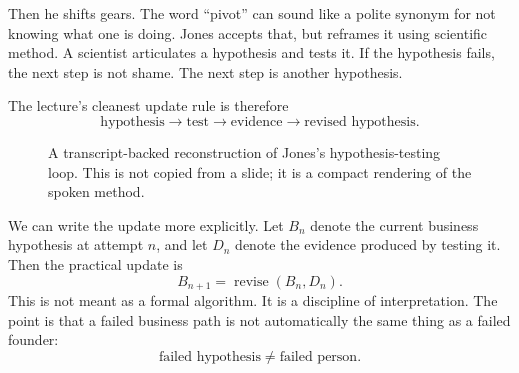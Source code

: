 Then he shifts gears. The word ``pivot'' can sound like a polite synonym for not knowing what one is doing. Jones accepts that, but reframes it using scientific method. A scientist articulates a hypothesis and tests it. If the hypothesis fails, the next step is not shame. The next step is another hypothesis.

The lecture's cleanest update rule is therefore
\begin{equation}
\text{hypothesis}
\longrightarrow
\text{test}
\longrightarrow
\text{evidence}
\longrightarrow
\text{revised hypothesis}.
\end{equation}

\begin{figure}
\centering
{}
\caption{A transcript-backed reconstruction of Jones's hypothesis-testing loop. This is not copied from a slide; it is a compact rendering of the spoken method.}
\end{figure}

We can write the update more explicitly. Let \(B_n\) denote the current business hypothesis at attempt \(n\), and let \(D_n\) denote the evidence produced by testing it. Then the practical update is
\begin{equation}
B_{n+1}=\operatorname{revise}(B_n,D_n).
\end{equation}
This is not meant as a formal algorithm. It is a discipline of interpretation. The point is that a failed business path is not automatically the same thing as a failed founder:
\begin{equation}
\text{failed hypothesis}\neq\text{failed person}.
\end{equation}


